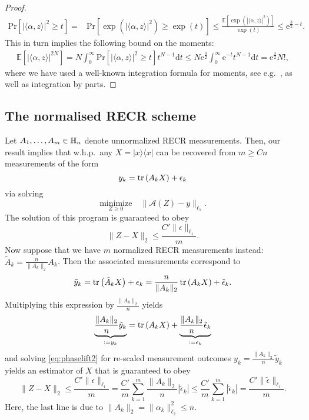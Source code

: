 \begin{proof}
\begin{align}
  \mathrm{Pr} \left[ | \langle \alpha, z \rangle|^2 \geq t \right]
  =& \mathrm{Pr} \left[ \exp \left( | \langle  \alpha, z \rangle|^2 \right) \geq \exp \left( t \right) \right]
  \leq \frac{ \mathbb{E} \left[ \exp \left( | \langle \alpha,  z \rangle|^2 \right) \right]}{\exp (t)} \leq \mathrm{e}^{\frac{3}{2}-t}.
\end{align}
This in turn implies the following bound on the moments:
\begin{align}
  \mathbb{E} \left[ | \langle  \alpha, z \rangle|^{2N} \right]
  =  N \int_0^\infty \mathrm{Pr}\left[ | \langle  \alpha, z \rangle|^2\geq t \right] t^{N-1} \mathrm{d}t \leq N \mathrm{e}^{\frac{3}{2}} \int_0^\infty \mathrm{e}^{-t} t^{N-1} \mathrm{d}t
  = \mathrm{e}^{\frac{3}{2}} N!,
\end{align}
where we have used a well-known integration formula for moments, see e.g.\ \cite[Prop.~7.1]{Foucart_2013_Mathematical}, as well as integration by parts.
\end{proof}


\subsection{The normalised RECR scheme}
\label{sub:pl.normalized_recr}


Let $ A_1,\ldots, A_m \in \mathbb{H}_n$ denote unnormalized RECR measurements.
Then, our result implies that w.h.p.\ any $ X = | x \rangle \!\langle  x|$ can be recovered from $m \geq  C n$ measurements of the form
\[
  y_k = \operatorname{tr} \left(  A_k  X \right) + \epsilon_k
\]
via solving
\[
  \underset{ Z\geq 0}{\textrm{minimize}} \quad \| \mathcal{A}( Z) -  y \|_{\ell_1}. \label{eq:phaselift2}
\]
The solution of this program is guaranteed to obey
\[
  \|  Z -  X \|_2 \leq \frac{C' \| \epsilon \|_{\ell_1}}{m}.
\]
Now suppose that we have $m$ normalized RECR measurements instead: $\tilde{ A}_k = \frac{n}{\|  A_k \|_{2}}  A_k$. Then the associated measurements correspond to
\[
  \tilde{y}_k = \operatorname{tr} \left( \tilde{ A}_k X \right) + \epsilon_k = \frac{ n}{\|  A_k \|_2} \operatorname{tr} \left(  A_k X \right) + \tilde{\epsilon}_k.
\]
Multiplying this expression by $\frac{\|  A_k \|_2}{n}$ yields
\[
\underset{:= y_k}{\underbrace{ \frac{ \|  A_k \|_2}{n}\tilde{y}_k}}
= \operatorname{tr} \left(  A_k X \right) + \underset{:= \epsilon_k}{\underbrace{ \frac{ \|  A_k \|_2}{n}\tilde{\epsilon}_k}}
\]
and solving \eqref{eq:phaselift2} for re-scaled measurement outcomes $y_k = \frac{ \|  A_k \|_2}{n}\tilde{y}_k$ yields an estimator of $ X$ that is guaranteed to obey
\[
  \|  Z -  X \|_2 \leq \frac{C' \|  \epsilon \|_{\ell_1}}{m}
  = \frac{C'}{m} \sum_{k=1}^m \frac{ \|  A_k \|_2}{n} | \tilde{\epsilon}_k |
  \leq \frac{C'}{m} \sum_{k=1}^m | \tilde{\epsilon}_k| = \frac{C' \| \tilde{\epsilon} \|_{\ell_1}}{m}.
\]
Here, the last line is due to $\|  A_k \|_2 = \| \alpha_k \|_{\ell_2}^2 \leq n$.

